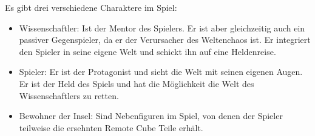 
Es gibt drei verschiedene Charaktere im Spiel:

\begin{itemize}
\item Wissenschaftler: Ist der Mentor des Spielers. Er ist aber gleichzeitig auch ein passiver Gegenspieler, da er der Verursacher des Weltenchaos ist. Er integriert den Spieler in seine eigene Welt und schickt ihn auf eine Heldenreise.
\item Spieler: Er ist der Protagonist und sieht die Welt mit seinen eigenen Augen. Er ist der Held des Spiels und hat die Möglichkeit die Welt des Wissenschaftlers zu retten.
\item Bewohner der Insel: Sind Nebenfiguren im Spiel, von denen der Spieler teilweise die ersehnten Remote Cube Teile erhält.
\end{itemize}